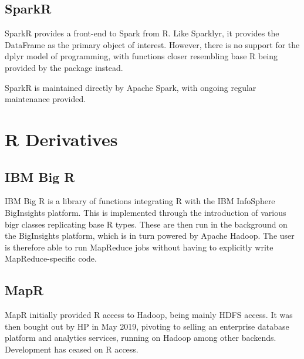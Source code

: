 \documentclass[10pt,a4paper]{article}
\begin{document}
\subsection{SparkR}
\label{sec:sparkr}
\nocite{venkataraman20:_spark}
SparkR provides a front-end to Spark from R. Like Sparklyr, it
provides the DataFrame as the primary object of interest. However,
there is no support for the dplyr model of programming, with functions
closer resembling base R being provided by the package instead.

SparkR is maintained directly by Apache Spark, with ongoing regular
maintenance provided.

\section{R Derivatives}
\label{sec:r-derivatives}

\subsection{IBM Big R}
\label{sec:ibm-big-r}
\nocite{inc.14:_infos_bigin_big_r}
IBM Big R is a library of functions integrating R with the IBM
InfoSphere BigInsights platform. This is implemented through the
introduction of various bigr classes replicating base R types. These
are then run in the background on the BigInsights platform, which is
in turn powered by Apache Hadoop. The user is therefore able to run
MapReduce jobs without having to explicitly write MapReduce-specific
code.

\subsection{MapR}
\label{sec:mapr}
\nocite{mapr19:_indus_next_gener_data_platf_ai_analy}
MapR initially provided R access to Hadoop, being mainly HDFS access.
It was then bought out by HP in May 2019, pivoting to selling an
enterprise database platform and analytics services, running on Hadoop
among other backends. Development has ceased on R access.

\printbibheading{}
\printbibliography[keyword=hadoop, title={Hadoop}]
\printbibliography[keyword=spark,title={Spark}]
\printbibliography[keyword=h2o,title=H2O]
\printbibliography[keyword=rpackage,title={R Packages}]
\printbibliography[keyword=rderiv,title={R Derivatives}]
\printbibliography[filter=other,title=Other]
\end{document}
